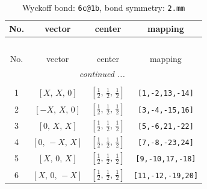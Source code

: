 \documentclass[fleqn,8pt]{jsarticle}
\begin{document}
\begin{longtable}{cccc}
\caption{Wyckoff bond: {\tt 6c@1b}, bond symmetry: {\tt 2.mm}}
 \\
 \hline \hline
No. & vector & center & mapping \\ \hline \endfirsthead

\multicolumn{3}{l}{\tablename\ \thetable{}} \\
 \hline \hline
No. & vector & center & mapping \\ \hline \endhead

 \hline \hline
\multicolumn{3}{r}{\footnotesize\it continued ...} \\ \endfoot

 \hline \hline
\multicolumn{3}{r}{} \\ \endlastfoot

1 & $\left[ X,\, X,\, 0 \right]$ & $\left[ \frac{1}{2},\, \frac{1}{2},\, \frac{1}{2} \right]$ & {\tt [1,-2,13,-14]} \\ \hline
2 & $\left[ - X,\, X,\, 0 \right]$ & $\left[ \frac{1}{2},\, \frac{1}{2},\, \frac{1}{2} \right]$ & {\tt [3,-4,-15,16]} \\ \hline
3 & $\left[ 0,\, X,\, X \right]$ & $\left[ \frac{1}{2},\, \frac{1}{2},\, \frac{1}{2} \right]$ & {\tt [5,-6,21,-22]} \\ \hline
4 & $\left[ 0,\, - X,\, X \right]$ & $\left[ \frac{1}{2},\, \frac{1}{2},\, \frac{1}{2} \right]$ & {\tt [7,-8,-23,24]} \\ \hline
5 & $\left[ X,\, 0,\, X \right]$ & $\left[ \frac{1}{2},\, \frac{1}{2},\, \frac{1}{2} \right]$ & {\tt [9,-10,17,-18]} \\ \hline
6 & $\left[ X,\, 0,\, - X \right]$ & $\left[ \frac{1}{2},\, \frac{1}{2},\, \frac{1}{2} \right]$ & {\tt [11,-12,-19,20]} \\
\end{longtable}
\renewcommand{\arraystretch}{1.2}
\end{document}
